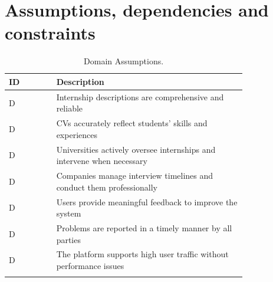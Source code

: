\section{Assumptions, dependencies and constraints}
\label{sec:assumptions_dependencies_and_constraints}%
\setcounter{da}{1}
\newcommand{\cda}{D\arabic{da}\stepcounter{da}} 
\begin{center}
    \renewcommand{\arraystretch}{2}
    \begin{longtable}{ l p{0.8\linewidth} } 
        \hline
        \textbf{ID} & \textbf{Description} \\ 
        \hline
        \cda & Internship descriptions are comprehensive and reliable \\ \hline
        \cda & CVs accurately reflect students' skills and experiences \\ \hline
        \cda & Universities actively oversee internships and intervene when necessary \\ \hline
        \cda & Companies manage interview timelines and conduct them professionally \\ \hline
        \cda & Users provide meaningful feedback to improve the system \\ \hline
        \cda & Problems are reported in a timely manner by all parties \\ \hline
        \cda & The platform supports high user traffic without performance issues \\ \hline
        \caption{Domain Assumptions.}
        \label{tab:worldph_tab}%
    \end{longtable}
\end{center}

